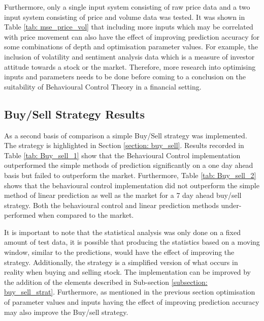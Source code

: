  \noindent Furthermore, only a single input system consisting of raw price data and a two input system consisting of price and volume data was tested. It was shown in Table \ref{tab: mse_price_vol} that including more inputs which may be correlated with price movement can also have the effect of improving prediction accuracy for some combinations of depth and optimisation parameter values. For example, the inclusion of volatility and sentiment analysis data which is a measure of investor attitude towards a stock or the market. Therefore, more research into optimising inputs and parameters needs to be done before coming to a conclusion on the suitability of Behavioural Control Theory in a financial setting.

\subsection{Buy/Sell Strategy Results}

As a second basis of comparison a simple Buy/Sell strategy was implemented. The strategy is highlighted in Section \ref{section: buy_sell}. Results recorded in Table \ref{tab: Buy_sell_1} show that the Behavioural Control implementation outperformed the simple methods of prediction significantly on a one day ahead basis but failed to outperform the market. Furthermore, Table \ref{tab: Buy_sell_2} shows that the behavioural control implementation did not outperform the simple method of linear prediction as well as the market for a 7 day ahead buy/sell strategy. Both the behavioural control and linear prediction methods under-performed when compared to the market. 

\noindent It is important to note that the statistical analysis was only done on a fixed amount of test data, it is possible that producing the statistics based on a moving window, similar to the predictions, would have the effect of improving the strategy. Additionally, the strategy is a simplified version of what occurs in reality when buying and selling stock. The implementation can be improved by the addition of the elements described in Sub-section \ref{subsection: buy_sell_strat}. Furthermore, as mentioned in the previous section optimisation of parameter values and inputs having the effect of improving prediction accuracy may also improve the Buy/sell strategy. 






